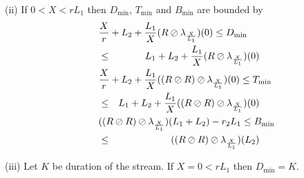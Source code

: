 \begin{theorem}
\noindent
(ii) If $0 < X < rL_1$ then $D_{\min}$, $T_{\min}$ and $B_{\min}$ are bounded by
\begin{eqnarray}
 \mylabel{eq:optimalplaybackdelayCBRtwonetworkssmallbuf}
\lefteqn {\frac{X}{r} + L_2 + \frac{L_1}{X} (R \oslash \lambda_{\frac{X}{L_1}})(0) \leq D_{\min}}  \nonumber \\
 & \leq &  L_1 + L_2 + \frac{L_1}{X} (R \oslash \lambda_{\frac{X}{L_1}})(0) \\
\mylabel{eq:optimaltotaldelayCBRtwonetworkssmallbuf}
\lefteqn {\frac{X}{r} + L_2 + \frac{L_1}{X} ((R \oslash R) \oslash \lambda_{\frac{X}{L_1}})(0) \leq T_{\min}}  \nonumber \\
 & \leq &  L_1 + L_2 + \frac{L_1}{X} ((R \oslash  R) \oslash \lambda_{\frac{X}{L_1}})(0) \\
\mylabel{eq:optimalplaybackbufferCBRtwonetworkssmallbuf}
\lefteqn{ ((R \oslash  R) \oslash \lambda_{\frac{X}{L_1}})(L_1 + L_2) - r_2L_1 \leq  B_{\min}}  \nonumber \\
      & \leq & ((R \oslash R) \oslash \lambda_{\frac{X}{L_1}})(L_2)
\end{eqnarray}

\noindent
(iii) Let $K$ be duration of the stream. If $X = 0 < rL_1$ then  $D_{\min} = K$.
\end{theorem}


